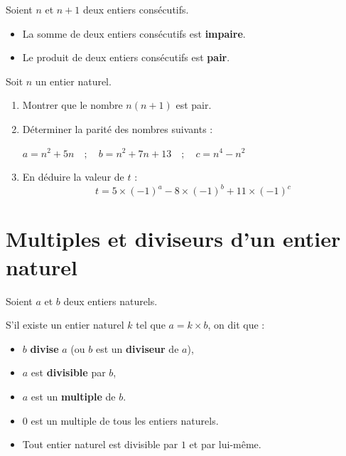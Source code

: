 \documentclass[10pt, a4paper]{article}
\begin{document}
\begin{Propriete}
Soient $n$ et $n+1$ deux entiers consécutifs.
\begin{itemize}[leftmargin=*,itemsep=0.5pt]
  \item La somme de deux entiers consécutifs est \textbf{impaire}.
  \item Le produit de deux entiers consécutifs est \textbf{pair}.
\end{itemize}
\end{Propriete}


\begin{Application}[][15 min]
Soit $n$ un entier naturel.
\begin{enumerate}[leftmargin=*,itemsep=0.5pt]
    \item Montrer que le nombre $n(n+1)$ est pair.
    \item Déterminer la parité des nombres suivants :
\begin{center}
$a=n^2+5n \quad ; \quad b=n^2+7n+13 \quad ; \quad c=n^4-n^2$
\end{center}
\item En déduire la valeur de $t$ :
\[  t=5\times(-1)^a-8\times(-1)^b+11\times(-1)^c \]
\end{enumerate}
\end{Application}



\section{Multiples et diviseurs d'un entier naturel }

\begin{Definition}
Soient $a$ et $b$ deux entiers naturels.

S'il existe un entier naturel $k$ tel que $a = k \times b$, on dit que :
\begin{itemize}[leftmargin=*,itemsep=0.5pt]
  \item $b$ \textbf{divise} $a$ (ou $b$ est un \textbf{diviseur} de $a$),
  \item $a$ est \textbf{divisible} par $b$,
  \item $a$ est un \textbf{multiple} de $b$.
\end{itemize}
\end{Definition}

\begin{Remarque}
\begin{itemize}[leftmargin=*,itemsep=0.5pt]
  \item $0$ est un multiple de tous les entiers naturels.
  \item Tout entier naturel est divisible par $1$ et par lui-même.
\end{itemize}
\end{Remarque}
\end{document}
